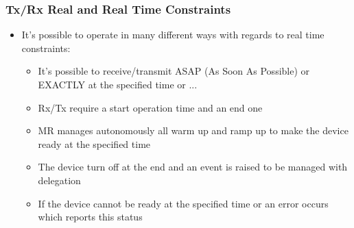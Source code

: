 \begin{frame}[fragile]
  \frametitle{Tx/Rx Real and Real Time Constraints}
  \begin{itemize}
    \item It's possible to operate in many different ways with regards to real time constraints:
    \begin{itemize}
    	\item It's possible to receive/transmit ASAP (As Soon As Possible) or EXACTLY at the specified time or ...
    	\item Rx/Tx require a start operation time and an end one
    	\item MR manages autonomously all warm up and ramp up to make the device ready at the specified time
    	\item The device turn off at the end and an event is raised to be managed with delegation
    	\item If the device cannot be ready at the specified time or an error occurs which reports this status
    \end{itemize}

  \end{itemize}
\end{frame}